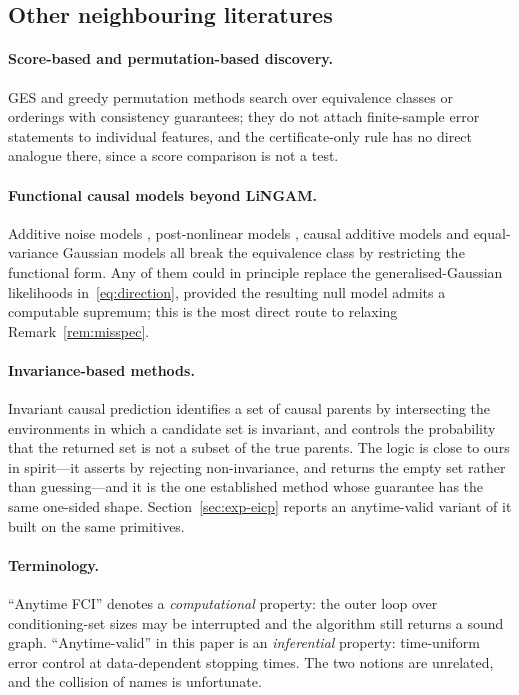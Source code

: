 \subsection{Other neighbouring literatures}\label{sec:neighbours}

\paragraph{Score-based and permutation-based discovery.} GES
\citep{chickering2002optimal} and greedy permutation methods
\citep{solus2021consistency} search over equivalence classes or orderings with
consistency guarantees; they do not attach finite-sample error statements to
individual features, and the certificate-only rule has no direct analogue
there, since a score comparison is not a test.

\paragraph{Functional causal models beyond LiNGAM.} Additive noise models
\citep{hoyer2009nonlinear}, post-nonlinear models
\citep{zhang2009identifiability}, causal additive models
\citep{buhlmann2014cam} and equal-variance Gaussian models
\citep{peters2014identifiability} all break the equivalence class by
restricting the functional form. Any of them could in principle replace the
generalised-Gaussian likelihoods in~\eqref{eq:direction}, provided the
resulting null model admits a computable supremum; this is the most direct
route to relaxing Remark~\ref{rem:misspec}.

\paragraph{Invariance-based methods.} Invariant causal prediction
\citep{peters2016causal} identifies a set of causal parents by intersecting
the environments in which a candidate set is invariant, and controls the
probability that the returned set is not a subset of the true parents. The
logic is close to ours in spirit---it asserts by rejecting non-invariance, and
returns the empty set rather than guessing---and it is the one established
method whose guarantee has the same one-sided shape.
Section~\ref{sec:exp-eicp} reports an anytime-valid variant of it built on the
same primitives.

\paragraph{Terminology.} ``Anytime FCI'' \citep{spirtes2001anytime} denotes a
\emph{computational} property: the outer loop over conditioning-set sizes may
be interrupted and the algorithm still returns a sound graph.
``Anytime-valid'' in this paper is an \emph{inferential} property:
time-uniform error control at data-dependent stopping times. The two notions
are unrelated, and the collision of names is unfortunate.
